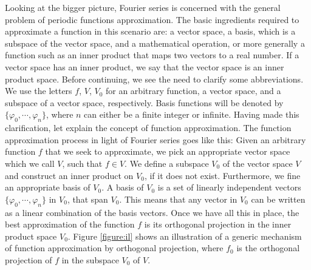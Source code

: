 \documentclass[11pt, oneside]{article}   	%
\begin{document}
Looking at the bigger picture, Fourier series is concerned with the general problem of periodic functions approximation. The basic ingredients required to approximate a function in this scenario are: a vector space, a basis, which is a subspace of the vector space, and a mathematical operation, or more generally a function such as an inner product that maps two vectors to a real number. If a vector space has an inner product, we say that the vector space is an inner product space. 
\justify
Before continuing, we see the need to clarify some abbreviations. We use the letters $f$, $V$, $V_{0}$ for an arbitrary function, a vector space, and a subspace of a vector space, respectively.
Basis functions will be denoted by $\{  \varphi_{0}, \cdots,\varphi_{n}\}$, where $n$ can either be a finite integer or infinite. Having made this clarification, let explain the concept of function approximation. 
\justify
The function approximation process in light of Fourier series goes like this: Given an arbitrary function $f$ that we seek to approximate, we pick an appropriate vector space which we call $V$, such that $f\in V$. We define a subspace $V_{0}$ of the vector space $V$ and construct an inner product on $V_{0}$, if it does not exist. Furthermore, we fine an appropriate basis of $V_{0}$.  A basis of $V_{0}$ is a set of linearly independent vectors   $\{  \varphi_{0}, \cdots,\varphi_{n}\}$ in $V_{0}$, that span $V_{0}$. This means that any vector in $V_{0}$ can be written as a linear combination of the basis vectors. Once we have all this in place, the best approximation of the function $f$ is its orthogonal projection in the inner product space $V_{0}$. Figure \ref{figure:il} shows an illustration of a generic mechanism of function approximation by orthogonal projection, where $f_{0}$ is the orthogonal projection of $f$ in the subspace $V_{0}$ of $V$.
\justify
\end{document}

